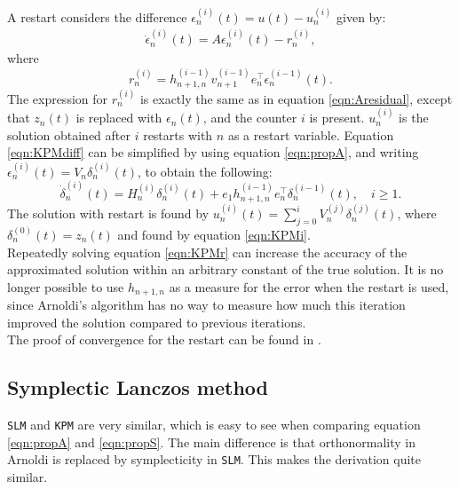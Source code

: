 \noindent A restart considers the difference $\epsilon_n^{(i)}(t) = u(t)-u_n^{(i)}$ given by:
\begin{equation}
\begin{aligned}
\dot{\epsilon}_n^{(i)}(t)=A \epsilon_n^{(i)} (t)  - r_n^{(i)},
\end{aligned}
\label{eqn:KPMdiff}
\end{equation}
where 
\begin{equation*}
r_n^{(i)} = h_{n+1,n}^{(i-1)} v_{n+1}^{(i-1)} e_n^{\top} \epsilon_n^{(i-1)} (t).
\end{equation*}
\noindent The expression for $r_n^{(i)}$ is exactly the same as in equation \eqref{eqn:Aresidual}, except that $z_n(t)$ is replaced with $\epsilon_n(t)$, and the counter $i$ is present. $u_n^{(i)}$ is the solution obtained after $i$ restarts with $n$ as a restart variable. 
\noindent Equation \eqref{eqn:KPMdiff} can be simplified by using equation \eqref{eqn:propA}, and writing $ \epsilon^{(i)}_n(t)  = V_n \delta_n^{(i)}(t) $, to obtain the following:
\begin{equation}
\dot{\delta}^{(i)}_n(t) = H_n^{(i)} \delta_n^{(i)}(t) + e_1 h_{n+1,n}^{(i-1)} e^\top_n \delta_n^{(i-1)}(t), \quad i \geq 1.
\label{eqn:KPMr}
\end{equation}
\noindent The solution with restart is found by $ u_n^{(i)}(t) = \sum \limits_{j = 0} ^i V_n^{(j)} \delta_n^{(j)} (t) $, where $\delta_n^{(0)} (t) = z_n(t)$ and found by equation \eqref{eqn:KPMi}.\\%

\noindent Repeatedly solving equation \ref{eqn:KPMr} can increase the accuracy of the approximated solution within an arbitrary constant of the true solution. It is no longer possible to use $h_{n+1,n}$ as a measure for the error when the restart is used, since Arnoldi's algorithm has no way to measure how much this iteration improved the solution compared to previous iterations.\\

\noindent The proof of convergence for the restart can be found in \cite{elenaconv}.\\
\subsection{Symplectic Lanczos method}
\texttt{SLM} and \texttt{KPM} are very similar, which is easy to see when comparing equation \eqref{eqn:propA} and \eqref{eqn:propS}. The main difference is that orthonormality in Arnoldi is replaced by symplecticity in \texttt{SLM}. This makes the derivation quite similar.\\

